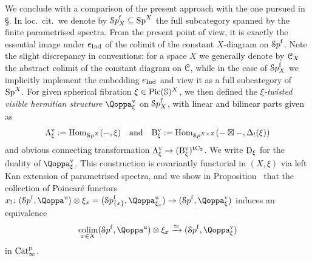 We conclude with a comparison of the present approach with the one pursued in \S{}. In loc.\ cit.\ we denote by ${\mathcal Sp}^{\mathrm{f}}_X \subseteq \mathrm{Sp}^X$ the full subcategory spanned by the finite parametrised spectra. %
From the present point of view, it is exactly the essential image under $e_{\operatorname{Ind}}$ %
of the colimit of the constant $X$-diagram on ${\mathcal Sp}^{\mathrm{f}}$. 
Note the slight discrepancy in conventions: for a space $X$ we generally denote by $\mathcal C_X$ the abstract colimit of the constant diagram on $\mathcal C$, while in the case of ${\mathcal Sp}^{\mathrm{f}}_X$ we implicitly implement the embedding $e_{\operatorname{Ind}}$ and view it as a full subcategory of $\mathrm{Sp}^X$.  
For given spherical fibration $\xi\in \operatorname{Pic}(\mathbb{S})^X$, we then defined the \emph{$\xi$-twisted visible hermitian structure} $\QF^\vis_\xi$ on ${\mathcal Sp}^{\mathrm{f}}_X$, with linear and bilinear parts given as
\[
 \Lambda^{\mathrm{v}}_{\xi} := \operatorname{Hom}_{{\mathcal Sp}^X} (-, \xi) \quad \mathrm{and} \quad \mathrm{B}^{\mathrm{v}}_{\xi} := \operatorname{Hom}_{{\mathcal Sp}^{X\times X}}(-\boxtimes -, \Delta_!(\xi)) 
\]
and obvious connecting transformation $\Lambda^{\mathrm{v}}_{\xi}\to (\mathrm{B}^{\mathrm{v}}_{\xi})^{\mathrm{t}\mathrm{C_2}}$. We write $
\mathrm{D}_{\xi}$ for the duality of $\QF^{\vis}_{\xi}$.
This construction is covariantly functorial in $(X,\xi)$ via left Kan extension of parametrised spectra, %
and we show in Proposition~ that the collection of Poincaré functors $x_!\colon (\Spaf,\QF^{\uni})\otimes \xi_x = (\Spaf_{\{x\}},\QF^{\uni}_{\xi_x}) \to (\Spaf,\QF^{\vis}_\xi)$ induces an equivalence
\[
\colim_{x \in X} (\Spaf,\QF^{\uni})\otimes \xi_x \xrightarrow{\simeq} (\Spaf,\QF^{\vis}_\xi)
\]
in $\mathrm{Cat}^{\mathrm p}_\infty$. 


